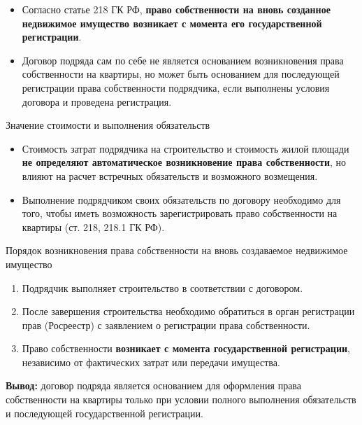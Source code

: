 \documentclass[14pt,a4paper]{extarticle}
\begin{document}
\begin{itemize}
    \item Согласно статье 218 ГК РФ, \textbf{право собственности на вновь созданное недвижимое имущество возникает с момента его государственной регистрации}.
    \item Договор подряда сам по себе не является основанием возникновения права собственности на квартиры, но может быть основанием для последующей регистрации права собственности подрядчика, если выполнены условия договора и проведена регистрация.
\end{itemize}

Значение стоимости и выполнения обязательств

\begin{itemize}
    \item Стоимость затрат подрядчика на строительство и стоимость жилой площади \textbf{не определяют автоматическое возникновение права собственности}, но влияют на расчет встречных обязательств и возможного возмещения.
    \item Выполнение подрядчиком своих обязательств по договору необходимо для того, чтобы иметь возможность зарегистрировать право собственности на квартиры (ст. 218, 218.1 ГК РФ).
\end{itemize}

Порядок возникновения права собственности на вновь создаваемое недвижимое имущество

\begin{enumerate}
    \item Подрядчик выполняет строительство в соответствии с договором.
    \item После завершения строительства необходимо обратиться в орган регистрации прав (Росреестр) с заявлением о регистрации права собственности.
    \item Право собственности \textbf{возникает с момента государственной регистрации}, независимо от фактических затрат или передачи имущества.
\end{enumerate}

\textbf{Вывод:} договор подряда является основанием для оформления права собственности на квартиры только при условии полного выполнения обязательств и последующей государственной регистрации.
\end{document}
